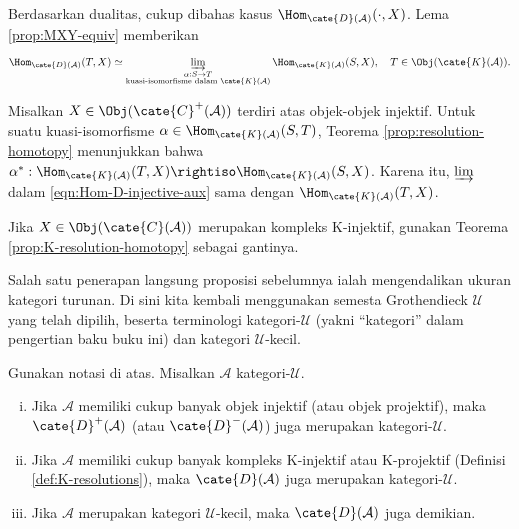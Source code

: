\begin{bukti}
	Berdasarkan dualitas, cukup dibahas kasus
	$\Hom_{\cate{D}(\mathcal{A})}(\cdot, X)$. Lema
	\ref{prop:MXY-equiv} memberikan
	\begin{equation}\label{eqn:Hom-D-injective-aux}
		\Hom_{\cate{D}(\mathcal{A})}(T, X) \simeq \varinjlim_{\substack{\alpha: S \to T \\ \text{kuasi-isomorfisme dalam }\cate{K}(\mathcal{A})}} \Hom_{\cate{K}(\mathcal{A})}(S, X), \quad T \in \Obj(\cate{K}(\mathcal{A})).
	\end{equation}

	Misalkan $X \in \Obj(\cate{C}^+(\mathcal{A}))$ terdiri atas objek-objek
	injektif. Untuk suatu kuasi-isomorfisme
	$\alpha \in \Hom_{\cate{K}(\mathcal{A})}(S, T)$, Teorema
	\ref{prop:resolution-homotopy} menunjukkan bahwa
	$\alpha^*: \Hom_{\cate{K}(\mathcal{A})}(T, X) \rightiso
	\Hom_{\cate{K}(\mathcal{A})}(S, X)$. Karena itu, $\varinjlim$ dalam
	\eqref{eqn:Hom-D-injective-aux} sama dengan
	$\Hom_{\cate{K}(\mathcal{A})}(T, X)$.
	
	Jika $X \in \Obj(\cate{C}(\mathcal{A}))$ merupakan kompleks K-injektif,
	gunakan Teorema \ref{prop:K-resolution-homotopy} sebagai gantinya.
\end{bukti}

Salah satu penerapan langsung proposisi sebelumnya ialah mengendalikan ukuran
kategori turunan. Di sini kita kembali menggunakan semesta Grothendieck
$\mathcal{U}$ yang telah dipilih, beserta terminologi kategori-$\mathcal{U}$
(yakni ``kategori'' dalam pengertian baku buku ini) dan kategori
$\mathcal{U}$-kecil.

\begin{korolari}\label{prop:D-size}
	Gunakan notasi di atas. Misalkan $\mathcal{A}$ kategori-$\mathcal{U}$.
	\begin{enumerate}[(i)]
		\item Jika $\mathcal{A}$ memiliki cukup banyak objek injektif (atau objek
		projektif), maka $\cate{D}^+(\mathcal{A})$ (atau
		$\cate{D}^-(\mathcal{A})$) juga merupakan kategori-$\mathcal{U}$.
		\item Jika $\mathcal{A}$ memiliki cukup banyak kompleks K-injektif atau
		K-projektif (Definisi \ref{def:K-resolutions}), maka
		$\cate{D}(\mathcal{A})$ juga merupakan kategori-$\mathcal{U}$.
		\item Jika $\mathcal{A}$ merupakan kategori $\mathcal{U}$-kecil, maka
		$\cate{D}(\mathcal{A})$ juga demikian.
	\end{enumerate}
\end{korolari}

